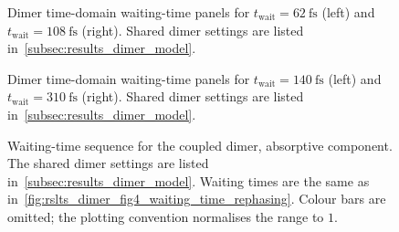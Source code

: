 \begin{figure}[htbp]
    \centering
    \begin{minipage}[t]{0.49\linewidth}
        \centering
        \safeplaceholdergraphic[1.22\linewidth]{\dimerFigFourWaitSixtyTwoPaperTimePath}
    \end{minipage}\hfill
    \begin{minipage}[t]{0.49\linewidth}
        \centering
        \safeplaceholdergraphic[1.22\linewidth]{\dimerFigFourWaitOneOhEightPaperTimePath}
    \end{minipage}
    \caption{Dimer time-domain waiting-time panels for
    \(t_{\mathrm{wait}}=\SI{62}{\femto\second}\) (left) and
    \(t_{\mathrm{wait}}=\SI{108}{\femto\second}\) (right). Shared dimer settings
    are listed in~\autoref{subsec:results_dimer_model}.}
    \label{fig:app_dimer_fig4_time_t62_t108}
\end{figure}

\begin{figure}[htbp]
    \centering
    \begin{minipage}[t]{0.49\linewidth}
        \centering
        \safeplaceholdergraphic[1.22\linewidth]{\dimerFigFourWaitOneFortyPaperTimePath}
    \end{minipage}\hfill
    \begin{minipage}[t]{0.49\linewidth}
        \centering
        \safeplaceholdergraphic[1.22\linewidth]{\dimerFigFourWaitThreeTenPaperTimePath}
    \end{minipage}
    \caption{Dimer time-domain waiting-time panels for
    \(t_{\mathrm{wait}}=\SI{140}{\femto\second}\) (left) and
    \(t_{\mathrm{wait}}=\SI{310}{\femto\second}\) (right). Shared dimer settings
    are listed in~\autoref{subsec:results_dimer_model}.}
    \label{fig:app_dimer_fig4_time_t140_t310}
\end{figure}

\begin{figure}[htbp]
    \centering
    \caption{Waiting-time sequence for the coupled dimer, absorptive component.
    The shared dimer settings are listed in~\autoref{subsec:results_dimer_model}.
    Waiting times are the same as
    in~\autoref{fig:rslts_dimer_fig4_waiting_time_rephasing}. Colour bars are
    omitted; the plotting convention normalises the range to \(1\).}
    \label{fig:rslts_dimer_fig4_waiting_time_absorptive}
\end{figure}

